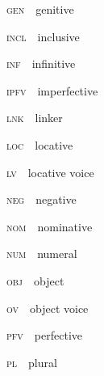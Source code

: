 \begin{styleStandard}
\textsc{gen\ \ }genitive
\end{styleStandard}

\begin{styleStandard}
\textsc{incl\ \ }inclusive
\end{styleStandard}

\begin{styleStandard}
\textsc{inf\ \ }infinitive
\end{styleStandard}

\begin{styleStandard}
\textsc{ipfv\ \ }imperfective
\end{styleStandard}

\begin{styleStandard}
\textsc{lnk\ \ }linker
\end{styleStandard}

\begin{styleStandard}
\textsc{loc\ \ }locative
\end{styleStandard}

\begin{styleStandard}
\textsc{lv\ \ }locative voice
\end{styleStandard}

\begin{styleStandard}
\textsc{neg\ \ }negative
\end{styleStandard}

\begin{styleStandard}
\textsc{nom\ \ }nominative
\end{styleStandard}

\begin{styleStandard}
\textsc{num\ \ }numeral
\end{styleStandard}

\begin{styleStandard}
\textsc{obj\ \ }object
\end{styleStandard}

\begin{styleStandard}
\textsc{ov\ \ }object voice
\end{styleStandard}

\begin{styleStandard}
\textsc{pfv\ \ }perfective
\end{styleStandard}

\begin{styleStandard}
\textsc{pl\ \ }plural
\end{styleStandard}

